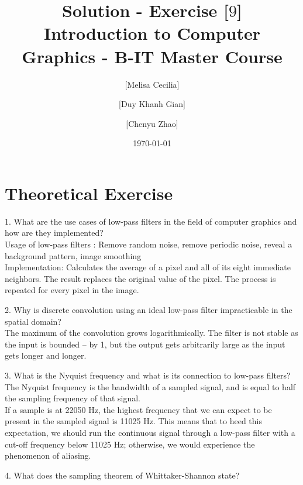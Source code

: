 \documentclass[10pt,a4paper]{article}
\begin{document}
\title{Solution - Exercise [$9$]\\
\small{Introduction to Computer Graphics - B-IT Master Course}}
\author{ [Melisa Cecilia] \and [Duy Khanh Gian] \and [Chenyu Zhao]}
\date{\today}
\maketitle

\section*{Theoretical Exercise}

\begin{flushleft}
1. What are the use cases of low-pass filters in the field of computer graphics and how are they implemented? \\[1\baselineskip]

Usage of low-pass filters : Remove random noise, remove periodic noise, reveal a background pattern, image smoothing \\[1\baselineskip]
Implementation:  Calculates the average of a pixel and all of its eight immediate neighbors. The result replaces the original value of the pixel. The process is repeated for every pixel in the image.
\end{flushleft}

\begin{flushleft}
2. Why is discrete convolution using an ideal low-pass filter impracticable in the spatial domain? \\[1\baselineskip]

The maximum of the convolution grows logarithmically. The filter is not stable as the input is bounded -- by 1, but the output gets arbitrarily large as the input gets longer and longer.

\end{flushleft}

\begin{flushleft}
3. What is the Nyquist frequency and what is its connection to low-pass filters?  \\[1\baselineskip]

The Nyquist frequency is the bandwidth of a sampled signal, and is equal to half the sampling frequency of that signal. \\
If a sample is at 22050 Hz, the highest frequency that we can expect to be present in the sampled signal is 11025 Hz. This means that to heed this expectation, we should run the continuous signal through a low-pass filter with a cut-off frequency below 11025 Hz; otherwise, we would experience the phenomenon of aliasing.

\end{flushleft}

\begin{flushleft}
4. What does the sampling theorem of Whittaker-Shannon state?  \\[1\baselineskip]

\end{flushleft}
\end{document}
